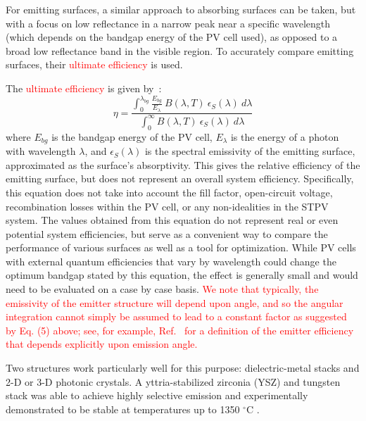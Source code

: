\documentclass[review]{elsarticle}
\begin{document}
For emitting surfaces, a similar approach to absorbing surfaces can be taken, but with a focus on low reflectance in a narrow peak near a specific wavelength (which depends on the bandgap energy of the PV cell used), as opposed to a broad low reflectance band in the visible region.  To accurately compare emitting surfaces, their \textcolor{red}{ultimate efficiency} is used.

The \textcolor{red}{ultimate efficiency} is given by~\cite{me2}:
\begin{equation}\label{SpecEff}
\eta = \frac{  \int_0^{\lambda_{bg}} \frac{ E_{bg} }{E_{\lambda}} \: B(\lambda, T) \: \epsilon_S (\lambda) \: d\lambda }
{\int_0^{\infty} B(\lambda,T) \: \epsilon_S (\lambda) \: d\lambda}
\end{equation}
where $E_{bg}$ is the
bandgap energy of the PV cell, $E_{\lambda}$ is the energy of a photon
with wavelength $\lambda$, and $\epsilon_S (\lambda)$ is the spectral
emissivity of the emitting surface, approximated as the surface's
absorptivity.  This gives the relative efficiency of the
emitting surface, but does not represent an overall system efficiency.
Specifically, this equation does not take into account the fill factor,
open-circuit voltage, recombination losses within the PV cell, or any
non-idealities in the STPV system.  The values obtained from this equation
do not represent real or even potential system efficiencies, but serve as
a convenient way to compare the performance of various surfaces as well as
a tool for optimization.  While PV cells with external quantum
efficiencies that vary by wavelength could change the optimum bandgap
stated by this equation, the effect is generally small and would need to
be evaluated on a case by case basis.  \textcolor{red}{We note that typically, the emissivity of the emitter structure
will depend upon angle, and so the angular integration cannot simply be assumed to lead to a constant factor as suggested
by Eq. (5) above; see, for example, Ref.~\cite{RF_OptExp_2009} for a definition of the emitter efficiency that depends
explicitly upon emission angle.}

Two structures work particularly well for this purpose: dielectric-metal stacks and 2-D or 3-D photonic crystals.  A yttria-stabilized zirconia (YSZ) and tungsten stack was able to achieve highly selective emission and experimentally demonstrated to be stable at temperatures up to 1350 $^\circ$C \cite{SKY_JPE_2015}.
\end{document}
